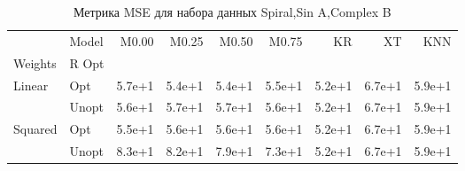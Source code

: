 \begin{table}
\caption{Метрика MSE для набора данных Spiral,Sin A,Complex B}
\label{tab:MSE_Spiral,Sin A,Complex B}
\begin{tabular}{llrrrrrrr}
\toprule
 & Model & M0.00 & M0.25 & M0.50 & M0.75 & KR & XT & KNN \\
Weights & R Opt &  &  &  &  &  &  &  \\
\midrule
\multirow[t]{2}{*}{Linear} & Opt & 5.7e+1 & 5.4e+1 & 5.4e+1 & 5.5e+1 & 5.2e+1 & 6.7e+1 & 5.9e+1 \\
 & Unopt & 5.6e+1 & 5.7e+1 & 5.7e+1 & 5.6e+1 & 5.2e+1 & 6.7e+1 & 5.9e+1 \\

\multirow[t]{2}{*}{Squared} & Opt & 5.5e+1 & 5.6e+1 & 5.6e+1 & 5.6e+1 & 5.2e+1 & 6.7e+1 & 5.9e+1 \\
 & Unopt & 8.3e+1 & 8.2e+1 & 7.9e+1 & 7.3e+1 & 5.2e+1 & 6.7e+1 & 5.9e+1 \\

\bottomrule
\end{tabular}
\end{table}
